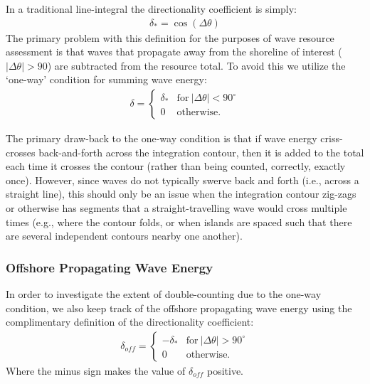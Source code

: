 In a traditional line-integral the directionality coefficient is simply:
\begin{align}
    \delta_{*} = \cos(\Delta \theta)
    \label{eqn:trad-def}
\end{align}
The primary problem with this definition for the purposes of wave resource assessment is that waves that propagate away from the shoreline of interest ($|\Delta \theta | > 90$) are subtracted from the resource total. To avoid this we utilize the `one-way' condition for summing wave energy:
\begin{align}
    \delta = 
    \begin{cases}
     \delta_* & \mathrm{for\ }|\Delta \theta|<90^\circ \\
    0 & \mathrm{otherwise}.
    \end{cases}
    \label{eqn:1way-def}
\end{align}

The primary draw-back to the one-way condition is that if wave energy criss-crosses back-and-forth across the integration contour, then it is added to the total each time it crosses the contour (rather than being counted, correctly, exactly once). However, since waves do not typically swerve back and forth (i.e., across a straight line), this should only be an issue when the integration contour zig-zags or otherwise has segments that a straight-travelling wave would cross multiple times (e.g., where the contour folds, or when islands are spaced such that there are several independent contours nearby one another).

\subsubsection{Offshore Propagating Wave Energy}

In order to investigate the extent of double-counting due to the one-way condition, we also keep track of the offshore propagating wave energy using the complimentary definition of the directionality coefficient:
\begin{align}
  \label{eqn:1way-off-def}
    \delta_{off} = 
    \begin{cases}
     -\delta_* & \mathrm{for\ }|\Delta \theta|>90^\circ \\
    0 & \mathrm{otherwise}.
    \end{cases}
\end{align}
Where the minus sign makes the value of $\delta_{off}$ positive.


